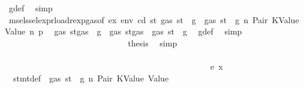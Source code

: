 \begin{isabellebody}
\ g{\isacharunderscore}{\kern0pt}def\ \isamarkupfalse%
\ simp\isanewline
\ \ \ \ \ \ \ \ \ \ \ \ \ \ \ \ \ \ \ \ \ \ \ \ \ \ \isamarkupfalse%
\ \isamarkupfalse%
\ msel{\isacharunderscore}{\kern0pt}ssel{\isacharunderscore}{\kern0pt}expr{\isacharunderscore}{\kern0pt}load{\isacharunderscore}{\kern0pt}rexp{\isacharunderscore}{\kern0pt}gas{\isacharparenleft}{\kern0pt}{}{\isacharparenright}{\kern0pt}{\isacharbrackleft}{\kern0pt}of\ ex\ env\ cd\ st{\isacharprime}{\kern0pt}\ {\isachardoublequoteopen}gas\ st\ {\isacharminus}{\kern0pt}\ g{\isachardoublequoteclose}{\isacharbrackright}{\kern0pt}\ {\isacharbackquoteopen}{\isasymnot}\ gas\ st\ {\isasymle}\ g{\isacharbackquoteclose}\ n\ Pair\ KValue\ Value\ n{}\ p{}\ \isamarkupfalse%
\ {\isachardoublequoteopen}gas\ {\isacharparenleft}{\kern0pt}st{\isacharprime}{\kern0pt}{\isasymlparr}gas\ {\isacharcolon}{\kern0pt}{\isacharequal}{\kern0pt}\ g{\isacharprime}{\kern0pt}{\isasymrparr}{\isacharparenright}{\kern0pt}\ {\isasymle}\ gas\ {\isacharparenleft}{\kern0pt}st{\isasymlparr}gas\ {\isacharcolon}{\kern0pt}{\isacharequal}{\kern0pt}\ gas\ st\ {\isacharminus}{\kern0pt}\ g{\isasymrparr}{\isacharparenright}{\kern0pt}{\isachardoublequoteclose}\ \isamarkupfalse%
\ g{\isacharunderscore}{\kern0pt}def\ \isamarkupfalse%
\ simp\isanewline
\ \ \ \ \ \ \ \ \ \ \ \ \ \ \ \ \ \ \ \ \ \ \ \ \ \ \isamarkupfalse%
\ \isamarkupfalse%
\ {\isacharquery}{\kern0pt}thesis\ \isamarkupfalse%
\ simp\isanewline
\ \ \ \ \ \ \ \ \ \ \ \ \ \ \ \ \ \ \ \ \ \ \ \ \isamarkupfalse%
\isanewline
\ \ \ \ \ \ \ \ \ \ \ \ \ \ \ \ \ \ \ \ \ \ \isamarkupfalse%
\isanewline
\ \ \ \ \ \ \ \ \ \ \ \ \ \ \ \ \ \ \ \ \isamarkupfalse%
\isanewline
\ \ \ \ \ \ \ \ \ \ \ \ \ \ \ \ \ \ \isamarkupfalse%
\isanewline
\ \ \ \ \ \ \ \ \ \ \ \ \ \ \ \ \isamarkupfalse%
\isanewline
\ \ \ \ \ \ \ \ \ \ \ \ \ \ \isamarkupfalse%
\isanewline
\ \ \ \ \ \ \ \ \ \ \ \ \ \ \ \ \isamarkupfalse%
\ {\isacharparenleft}{\kern0pt}e\ x{\isacharparenright}{\kern0pt}\isanewline
\ \ \ \ \ \ \ \ \ \ \ \ \ \ \ \ \isamarkupfalse%
\ {}{\isacharparenleft}{\kern0pt}{}{\isacharparenright}{\kern0pt}\ stmt{\isacharunderscore}{\kern0pt}def\ {\isacharbackquoteopen}{\isasymnot}\ gas\ st\ {\isasymle}\ g{\isacharbackquoteclose}\ n\ Pair\ KValue\ Value\ \isamarkupfalse%

\end{isabellebody}
